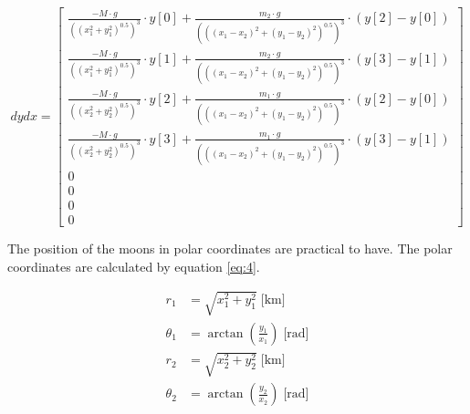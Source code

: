 \begin{equation}
dydx = \left[ \begin{matrix} \frac { -M\cdot g }{ \left( \left( x_{ 1 }^{ 2 }+y_{ 1 }^{ 2 } \right) ^{ 0.5 } \right) ^{ 3 } } \cdot y\left[ 0 \right] +\frac { m_{ 2 }\cdot g }{ \left( \left( \left( x_{ 1 }-x_{ 2 } \right) ^{ 2 }+\left( y_{ 1 }-y_{ 2 } \right) ^{ 2 } \right) ^{ 0.5 } \right)^{ 3 }  } \cdot\left( y\left[ 2 \right] -y\left[ 0 \right]  \right)  \\ \frac { -M\cdot g }{ \left( \left( x_{ 1 }^{ 2 }+y_{ 1 }^{ 2 } \right) ^{ 0.5 } \right) ^{ 3 } } \cdot y\left[ 1 \right] +\frac { m_{ 2 }\cdot g }{ \left( \left( \left( x_{ 1 }-x_{ 2 } \right) ^{ 2 }+\left( y_{ 1 }-y_{ 2 } \right) ^{ 2 } \right) ^{ 0.5 } \right) ^{ 3 } } \cdot \left( y\left[ 3 \right] -y\left[ 1 \right]  \right)  \\ \frac { -M\cdot g }{ \left( \left( x_{ 2 }^{ 2 }+y_{ 2 }^{ 2 } \right) ^{ 0.5 } \right) ^{ 3 } } \cdot y\left[ 2 \right] +\frac { m_{ 1 }\cdot g }{ \left( \left( \left( x_{ 1 }-x_{ 2 } \right) ^{ 2 }+\left( y_{ 1 }-y_{ 2 } \right) ^{ 2 } \right) ^{ 0.5 } \right) ^{ 3 } } \cdot \left( y\left[ 2 \right] -y\left[ 0 \right]  \right)  \\ \frac { -M\cdot g }{ \left( \left( x_{ 2 }^{ 2 }+y_{ 2 }^{ 2 } \right) ^{ 0.5 } \right) ^{ 3 } } \cdot y\left[ 3 \right] +\frac { m_{ 1 }\cdot g }{ \left( \left( \left( x_{ 1 }-x_{ 2 } \right) ^{ 2 }+\left( y_{ 1 }-y_{ 2 } \right) ^{ 2 } \right) ^{ 0.5 } \right) ^{ 3 } } \cdot \left( y\left[ 3 \right] -y\left[ 1 \right]  \right)  \\ 0 \\ 0 \\ 0 \\ 0 \end{matrix} \right] 
\label{eq:6}
\end{equation}

The position of the moons in polar coordinates are practical to have. The polar coordinates are calculated by equation \ref{eq:4}.

\begin{equation}
\begin{align*}
r_{ 1 }&=\sqrt { x_{ 1 }^{ 2 }+y_{ 1 }^{ 2 } } \; \text{[km]} \\ 
\theta _{ 1 }&=\arctan { \left( \frac { y_1 }{ x_1 }  \right)  } \; \text{[rad]} \\ 
r_{ 2 }&=\sqrt { x_{ 2 }^{ 2 }+y_{ 2 }^{ 2 } } \; \text{[km]} \\ 
\theta _{ 2 }&=\arctan { \left( \frac { y_2 }{ x_2 }  \right)  } \; \text{[rad]} 
\end{align*}
\label{eq:4}
\end{equation}

